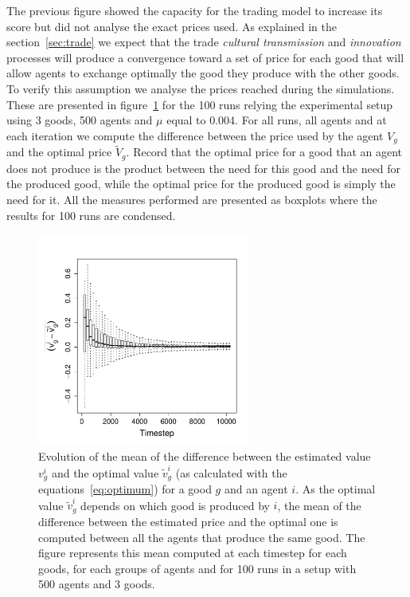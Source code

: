 \documentclass{wscpaperproc}
\begin{document}
The previous figure showed the capacity for the trading model to increase its score but did not analyse the exact prices used. As explained in the section~\ref{sec:trade} we expect that the trade \emph{cultural transmission} and \emph{innovation} processes will produce a convergence toward a set of price for each good that will allow agents to exchange optimally the good they produce with the other goods. To verify this assumption we analyse the prices reached during the simulations. These are presented in figure~\ref{fig:ratioEvol} for the 100 runs relying the experimental setup using 3 goods, 500 agents and $\mu$ equal to 0.004. For all runs, all agents and at each iteration we compute the difference between the price used by the agent $V_g$ and the optimal price $\tilde{V}_g$. Record that the optimal price for a good that an agent does not produce is the product between the need for this good and the need for the produced good, while the optimal price for the produced good is simply the need for it. All the measures performed are presented as boxplots where the results for 100 runs are condensed.

\begin{figure}[!h]
	\begin{center}
		\includegraphics[width=7cm]{img/ClearingPriceDistanceEvolutionForTrade-G3N500.pdf}
	\end{center}
	\caption{Evolution of the mean of the difference between the estimated value $v^i_g$ and the optimal value $\tilde{v}^i_g$ (as calculated with the equations~\ref{eq:optimum}) for a good $g$ and an agent $i$. As the optimal value $\tilde{v}^i_g$ depends on which good is produced by $i$, the mean of the difference between the estimated price and the optimal one is computed between all the agents that produce the same good. The figure represents this mean computed at each timestep for each goods, for each groups of agents and for 100 runs in a setup with 500 agents and 3 goods. }
	\label{fig:ratioEvol}
\end{figure}
\end{document}
